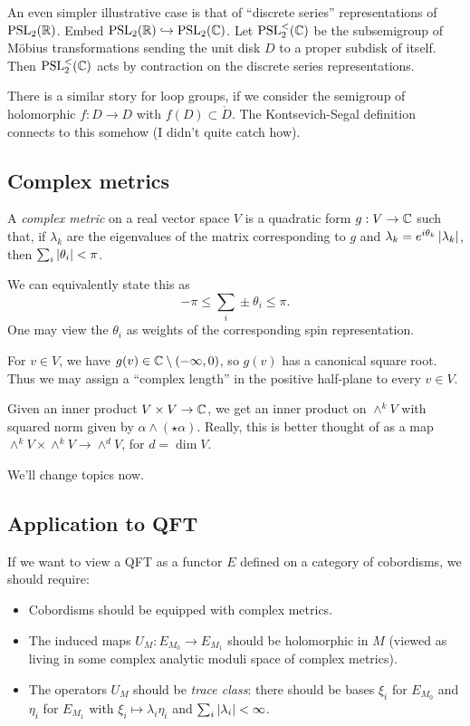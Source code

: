 An even simpler illustrative case is that of ``discrete series'' representations of $\mathrm{PSL}_2(\mathbb{R})$.
Embed $\mathrm{PSL}_2(\mathbb{R}) \hookrightarrow \mathrm{PSL}_2(\mathbb{C})$.
Let $\mathrm{PSL}_2^<(\mathbb{C})$ be the subsemigroup of M\"obius transformations sending the unit disk $D$ to a proper subdisk of itself.
Then $\mathrm{PSL}_2^<(\mathbb{C})$ acts by contraction on the discrete series representations.

There is a similar story for loop groups, if we consider the semigroup of holomorphic $f: D \to D$ with $f(D) \subset \mathring{D}$.
The Kontsevich-Segal definition connects to this somehow (I didn't quite catch how).

\subsection{Complex metrics}

\begin{dfn}
	A \emph{complex metric} on a real vector space $V$ is a quadratic form $g: V \to \mathbb{C}$ such that, if $\lambda_k$ are the eigenvalues of the matrix corresponding to $g$ and $\lambda_k = e^{i \theta_k} \left|{\lambda_k}\right|$, then $\sum_i \left|{\theta_i}\right| < \pi$.
\end{dfn}

We can equivalently state this as
\[
	-\pi \leq \sum_i \pm \theta_i \leq \pi.
\]
One may view the $\theta_i$ as weights of the corresponding spin representation.

For $v \in V$, we have $g(v) \in \mathbb{C} \setminus (-\infty, 0)$, so $g(v)$ has a canonical square root.
Thus we may assign a ``complex length'' in the positive half-plane to every $v \in V$.

Given an inner product $V \times V \to \mathbb{C}$, we get an inner product on $\wedge^k V$ with squared norm given by $\alpha \wedge (\star \alpha)$.
Really, this is better thought of as a map $\wedge^k V \times \wedge^k V \to \wedge^d V$, for $d = \dim V$.

We'll change topics now.

\subsection{Application to QFT}

If we want to view a QFT as a functor $E$ defined on a category of cobordisms, we should require:
\begin{itemize}
	\item Cobordisms should be equipped with complex metrics.
	\item The induced maps $U_M : E_{M_0} \to E_{M_1}$ should be holomorphic in $M$ (viewed as living in some complex analytic moduli space of complex metrics).
	\item The operators $U_M$ should be \emph{trace class}: there should be bases $\xi_i$ for $E_{M_0}$ and $\eta_i$ for $E_{M_1}$ with $\xi_i \mapsto \lambda_i \eta_i$ and $\sum_i \left|{\lambda_i}\right| < \infty$.
\end{itemize}


